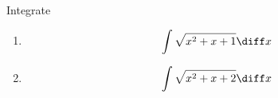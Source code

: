 Integrate
\begin{enumerate}
\item 
\[
\int \sqrt{x^2+x+1}\diff x
\]
\item 
\[
\int \sqrt{x^2+x+2}\diff x
\]
\end{enumerate}
